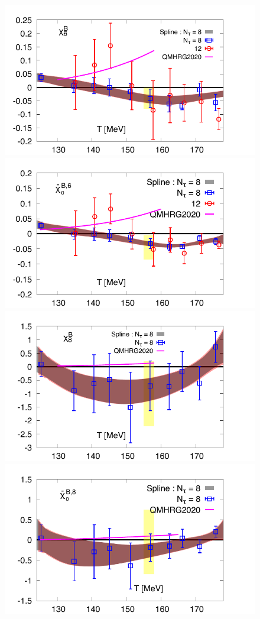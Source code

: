 \documentclass[pdflatex,prd,twocolumn,showpacs,superscriptaddress,nofootinbib]{revtex4-1}
\begin{document}
\begin{figure}[ht]
\includegraphics[scale=0.54]{fig/BQS600.pdf}
\includegraphics[scale=0.54]{fig/P6_r05.pdf}
\includegraphics[scale=0.54]{fig/BQS800.pdf}
\includegraphics[scale=0.54]{fig/P8_r05.pdf}

\end{figure}
\end{document}
